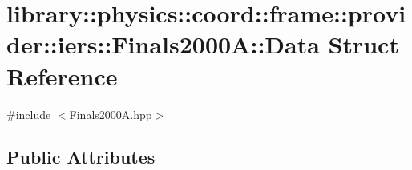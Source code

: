 \hypertarget{structlibrary_1_1physics_1_1coord_1_1frame_1_1provider_1_1iers_1_1_finals2000_a_1_1_data}{}\section{library\+:\+:physics\+:\+:coord\+:\+:frame\+:\+:provider\+:\+:iers\+:\+:Finals2000A\+:\+:Data Struct Reference}
\label{structlibrary_1_1physics_1_1coord_1_1frame_1_1provider_1_1iers_1_1_finals2000_a_1_1_data}


{\ttfamily \#include $<$Finals2000\+A.\+hpp$>$}

\subsection*{Public Attributes}
